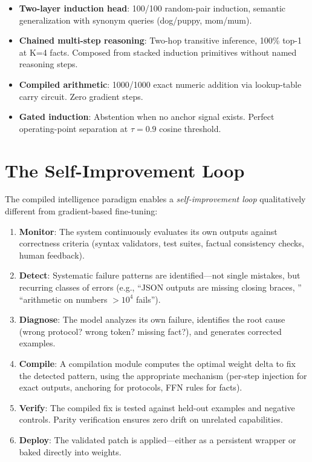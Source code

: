 \documentclass[11pt,a4paper]{article}
\begin{document}
\begin{itemize}[leftmargin=*]
\item \textbf{Two-layer induction head}: 100/100 random-pair induction, semantic generalization with synonym queries (dog/puppy, mom/mum).
\item \textbf{Chained multi-step reasoning}: Two-hop transitive inference, 100\% top-1 at K=4 facts. Composed from stacked induction primitives without named reasoning steps.
\item \textbf{Compiled arithmetic}: 1000/1000 exact numeric addition via lookup-table carry circuit. Zero gradient steps.
\item \textbf{Gated induction}: Abstention when no anchor signal exists. Perfect operating-point separation at $\tau=0.9$ cosine threshold.
\end{itemize}

\section{The Self-Improvement Loop}

The compiled intelligence paradigm enables a \emph{self-improvement loop} qualitatively different from gradient-based fine-tuning:

\begin{enumerate}[leftmargin=*]
\item \textbf{Monitor}: The system continuously evaluates its own outputs against correctness criteria (syntax validators, test suites, factual consistency checks, human feedback).
\item \textbf{Detect}: Systematic failure patterns are identified---not single mistakes, but recurring classes of errors (e.g., ``JSON outputs are missing closing braces, '' ``arithmetic on numbers $>10^4$ fails'').
\item \textbf{Diagnose}: The model analyzes its own failure, identifies the root cause (wrong protocol? wrong token? missing fact?), and generates corrected examples.
\item \textbf{Compile}: A compilation module computes the optimal weight delta to fix the detected pattern, using the appropriate mechanism (per-step injection for exact outputs, anchoring for protocols, FFN rules for facts).
\item \textbf{Verify}: The compiled fix is tested against held-out examples and negative controls. Parity verification ensures zero drift on unrelated capabilities.
\item \textbf{Deploy}: The validated patch is applied---either as a persistent wrapper or baked directly into weights.
\end{enumerate}
\end{document}
